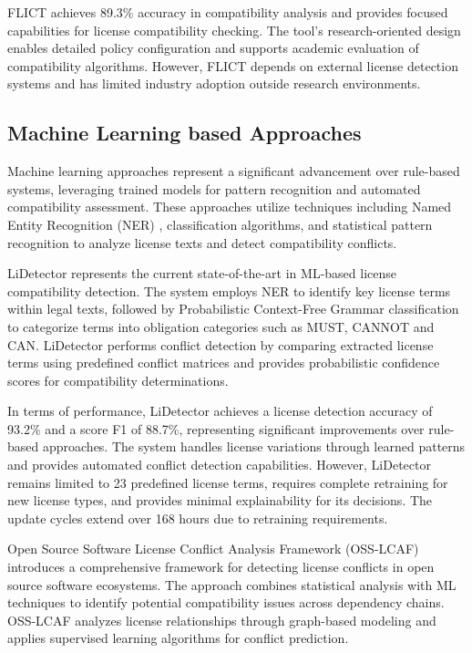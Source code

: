 FLICT achieves 89.3\% accuracy in compatibility analysis and provides focused capabilities for license compatibility checking. The tool's research-oriented design enables detailed policy configuration and supports academic evaluation of compatibility algorithms. However, FLICT depends on external license detection systems and has limited industry adoption outside research environments.

\subsection{Machine Learning based Approaches}

Machine learning approaches represent a significant advancement over rule-based systems, leveraging trained models for pattern recognition and automated compatibility assessment. These approaches utilize techniques including Named Entity Recognition (NER) \cite{LampleBSKD16}, classification algorithms, and statistical pattern recognition to analyze license texts and detect compatibility conflicts.





LiDetector \cite{DXuGFLLJ23} represents the current state-of-the-art in ML-based license compatibility detection. The system employs NER to identify key license terms within legal texts, followed by Probabilistic Context-Free Grammar classification to categorize terms into obligation categories such as MUST, CANNOT and CAN. LiDetector performs conflict detection by comparing extracted license terms using predefined conflict matrices and provides probabilistic confidence scores for compatibility determinations.

In terms of performance, LiDetector achieves a license detection accuracy of 93.2\% and a score F1 of 88.7\%, representing significant improvements over rule-based approaches. The system handles license variations through learned patterns and provides automated conflict detection capabilities. However, LiDetector remains limited to 23 predefined license terms, requires complete retraining for new license types, and provides minimal explainability for its decisions. The update cycles extend over 168 hours due to retraining requirements.




Open Source Software License Conflict Analysis Framework (OSS-LCAF) \cite{KaholTA25} introduces a comprehensive framework for detecting license conflicts in open source software ecosystems. The approach combines statistical analysis with ML techniques to identify potential compatibility issues across dependency chains. OSS-LCAF analyzes license relationships through graph-based modeling and applies supervised learning algorithms for conflict prediction.

